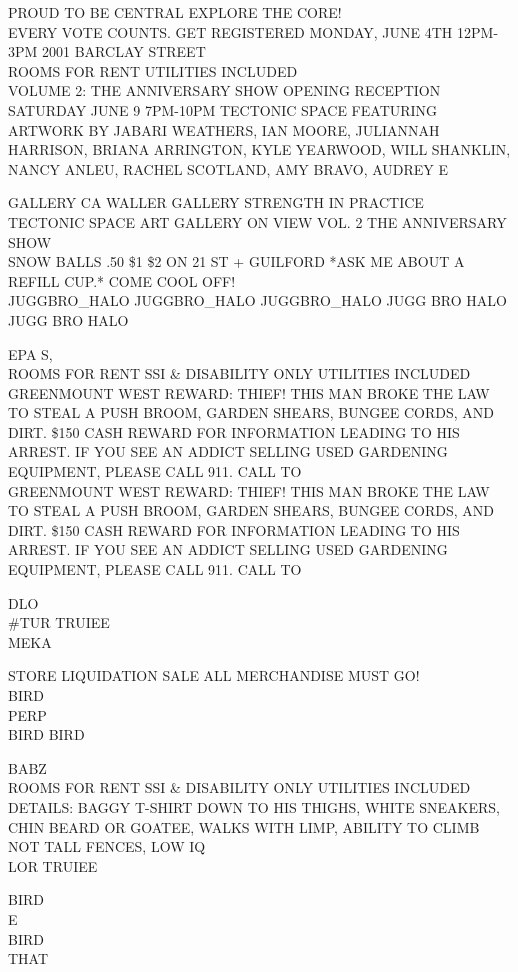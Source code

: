 \documentclass[10pt,letterpaper]{article}
\begin{document}
PROUD TO BE CENTRAL EXPLORE THE CORE!\\
EVERY VOTE COUNTS.  GET REGISTERED MONDAY, JUNE 4TH 12PM{-}3PM 2001 BARCLAY STREET\\
ROOMS FOR RENT  UTILITIES INCLUDED\\
VOLUME 2: THE ANNIVERSARY SHOW OPENING RECEPTION SATURDAY JUNE 9 7PM{-}10PM TECTONIC SPACE FEATURING ARTWORK BY JABARI WEATHERS, IAN MOORE, JULIANNAH HARRISON, BRIANA ARRINGTON, KYLE YEARWOOD, WILL SHANKLIN, NANCY ANLEU, RACHEL SCOTLAND, AMY BRAVO, AUDREY E

GALLERY CA WALLER GALLERY STRENGTH IN PRACTICE\\
TECTONIC SPACE ART GALLERY ON VIEW VOL. 2 THE ANNIVERSARY SHOW\\
SNOW BALLS .50 \$1 \$2 ON 21 ST + GUILFORD *ASK ME ABOUT A REFILL CUP.* COME COOL OFF!\\
JUGGBRO\_HALO JUGGBRO\_HALO JUGGBRO\_HALO JUGG BRO HALO JUGG BRO HALO

EPA S,\\
ROOMS FOR RENT SSI \& DISABILITY ONLY UTILITIES INCLUDED\\
GREENMOUNT WEST REWARD: THIEF!  THIS MAN BROKE THE LAW TO STEAL A PUSH BROOM, GARDEN SHEARS, BUNGEE CORDS, AND DIRT.  \$150 CASH REWARD FOR INFORMATION LEADING TO HIS ARREST.  IF YOU SEE AN ADDICT SELLING USED GARDENING EQUIPMENT, PLEASE CALL 911.  CALL TO\\
GREENMOUNT WEST REWARD: THIEF!  THIS MAN BROKE THE LAW TO STEAL A PUSH BROOM, GARDEN SHEARS, BUNGEE CORDS, AND DIRT.  \$150 CASH REWARD FOR INFORMATION LEADING TO HIS ARREST.  IF YOU SEE AN ADDICT SELLING USED GARDENING EQUIPMENT, PLEASE CALL 911.  CALL TO

DLO\\
\#TUR TRUIEE\\
MEKA

STORE LIQUIDATION SALE ALL MERCHANDISE MUST GO!\\
BIRD\\
PERP\\
BIRD BIRD

BABZ\\
ROOMS FOR RENT SSI \& DISABILITY ONLY UTILITIES INCLUDED\\
DETAILS: BAGGY T{-}SHIRT DOWN TO HIS THIGHS, WHITE SNEAKERS, CHIN BEARD OR GOATEE, WALKS WITH LIMP, ABILITY TO CLIMB NOT TALL FENCES, LOW IQ\\
LOR TRUIEE

BIRD\\
E\\
BIRD\\
THAT
\end{document}
